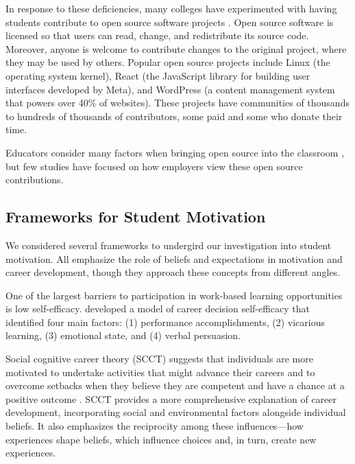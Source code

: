 In response to these deficiencies, many colleges have experimented with having students contribute to open source software projects \citep{choiOpenSourceSoftware2021,mullerEngagingStudentsOpen2019,hangIndustryMentoringInternship2024,menezesOpenSourceInternshipsIndustry2022,lovellContributorCatalystPilot2024,lovellScaffoldingStudentSuccess2021,dossantosmontagnerLearningProfessionalSoftware2022,salernoBarriersSelfEfficacyLargeScale2023,hislopStudentReflectionsLearning2020}. Open source software is licensed so that users can read, change, and redistribute its source code\citep{OpenSourceDefinition}. Moreover, anyone is welcome to contribute changes to the original project, where they may be used by others. Popular open source projects include Linux (the operating system kernel), React (the JavaScript library for building user interfaces developed by Meta), and WordPress (a content management system that powers over 40\% of websites). These projects have communities of thousands to hundreds of thousands of contributors, some paid and some who donate their time.

Educators consider many factors when bringing open source into the classroom \citep{nascimentoUsingOpenSource2013}, but few studies have focused on how employers view these open source contributions.

\subsection{Frameworks for Student Motivation}

We considered several frameworks to undergird our investigation into student motivation. All emphasize the role of beliefs and expectations in motivation and career development, though they approach these concepts from different angles.

One of the largest barriers to participation in work-based learning opportunities is low self-efficacy. \citet{hackettSelfefficacyApproachCareer1981} developed a model of career decision self-efficacy that identified four main factors: (1) performance accomplishments, (2) vicarious learning, (3) emotional state, and (4) verbal persuasion.

Social cognitive career theory (SCCT) suggests that individuals are more motivated to undertake activities that might advance their careers and to overcome setbacks when they believe they are competent and have a chance at a positive outcome \citep{lentUnifyingSocialCognitive1994}. SCCT provides a more comprehensive explanation of career development, incorporating social and environmental factors alongside individual beliefs. It also emphasizes the reciprocity among these influences---how experiences shape beliefs, which influence choices and, in turn, create new experiences.

